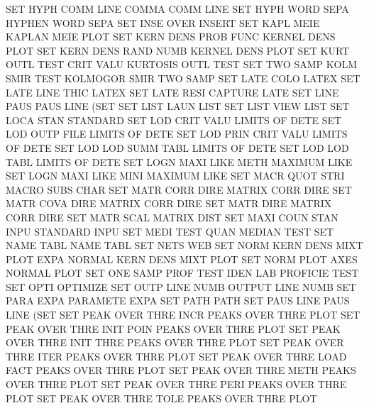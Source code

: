 SET      HYPH COMM LINE                 COMMA    COMM LINE
SET      HYPH WORD SEPA                 HYPHEN   WORD SEPA
SET      INSE OVER                      INSERT
SET      KAPL MEIE                      KAPLAN   MEIE PLOT
SET      KERN DENS PROB FUNC            KERNEL   DENS PLOT
SET      KERN DENS RAND NUMB            KERNEL   DENS PLOT
SET      KURT OUTL TEST CRIT VALU       KURTOSIS OUTL TEST
SET      TWO  SAMP KOLM SMIR TEST       KOLMOGOR SMIR TWO  SAMP
SET      LATE COLO                      LATEX
SET      LATE LINE THIC                 LATEX
SET      LATE RESI                      CAPTURE  LATE
SET      LINE PAUS                      PAUS     LINE (SET
SET      LIST LAUN                      LIST
SET      LIST VIEW                      LIST
SET      LOCA STAN                      STANDARD
SET      LOD      CRIT VALU             LIMITS   OF   DETE
SET      LOD      OUTP FILE             LIMITS   OF   DETE
SET      LOD      PRIN CRIT VALU        LIMITS   OF   DETE
SET      LOD      LOD  SUMM TABL        LIMITS   OF   DETE
SET      LOD      LOD  TABL             LIMITS   OF   DETE
SET      LOGN MAXI LIKE METH            MAXIMUM  LIKE
SET      LOGN MAXI LIKE MINI            MAXIMUM  LIKE
SET      MACR QUOT STRI                 MACRO    SUBS CHAR
SET      MATR CORR DIRE                 MATRIX   CORR DIRE
SET      MATR COVA DIRE                 MATRIX   CORR DIRE
SET      MATR DIRE                      MATRIX   CORR DIRE
SET      MATR SCAL                      MATRIX   DIST
SET      MAXI COUN STAN INPU            STANDARD INPU
SET      MEDI TEST QUAN                 MEDIAN   TEST
SET      NAME TABL                      NAME     TABL
SET      NETS                           WEB
SET      NORM KERN DENS MIXT PLOT EXPA  NORMAL   KERN DENS MIXT PLOT
SET      NORM PLOT AXES                 NORMAL   PLOT
SET      ONE  SAMP PROF TEST IDEN LAB   PROFICIE TEST
SET      OPTI                           OPTIMIZE
SET      OUTP LINE NUMB                 OUTPUT   LINE NUMB
SET      PARA EXPA                      PARAMETE EXPA
SET      PATH                           PATH
SET      PAUS LINE                      PAUS     LINE (SET
SET      PEAK OVER THRE INCR            PEAKS    OVER THRE PLOT
SET      PEAK OVER THRE INIT POIN       PEAKS    OVER THRE PLOT
SET      PEAK OVER THRE INIT THRE       PEAKS    OVER THRE PLOT
SET      PEAK OVER THRE ITER            PEAKS    OVER THRE PLOT
SET      PEAK OVER THRE LOAD FACT       PEAKS    OVER THRE PLOT
SET      PEAK OVER THRE METH            PEAKS    OVER THRE PLOT
SET      PEAK OVER THRE PERI            PEAKS    OVER THRE PLOT
SET      PEAK OVER THRE TOLE            PEAKS    OVER THRE PLOT
